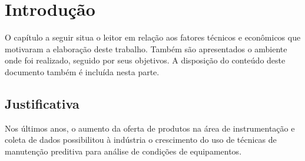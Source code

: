 \documentclass[12pt,openright,twoside,a4paper,
	chapter=TITLE,section=TITLE,
	english,brazil]{abntex2}
\begin{document}
	
	\textual %
	

	\chapter{Introdução}
	
	O capítulo a seguir situa o leitor em relação aos fatores técnicos e econômicos que motivaram a elaboração deste trabalho. Também são apresentados o ambiente onde foi realizado, seguido por seus objetivos. A disposição do conteúdo deste documento também é incluída nesta parte.
	
	\section{Justificativa}
	Nos últimos anos, o aumento da oferta de produtos na área de instrumentação e coleta de dados possibilitou à indústria o crescimento do uso de técnicas de manutenção preditiva para análise de condições de equipamentos. 
	
	
	\postextual
	
	
		
\end{document}
